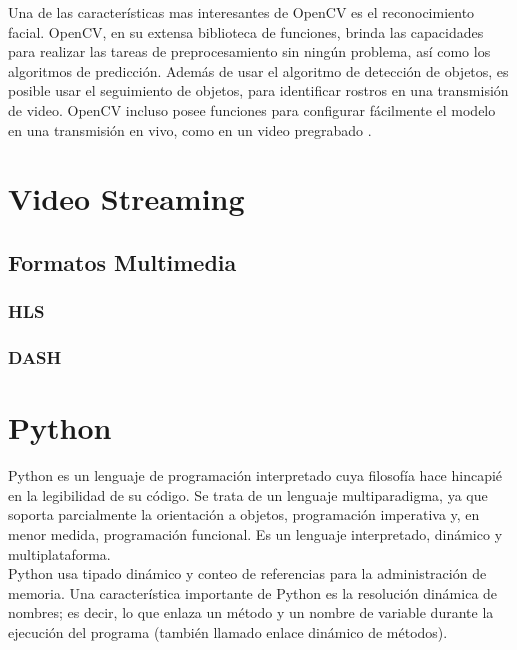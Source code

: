 Una de las características mas interesantes de OpenCV es el reconocimiento facial. OpenCV, en su extensa biblioteca de funciones, brinda las capacidades para realizar las tareas de preprocesamiento sin ningún problema, así como los algoritmos de predicción. Además de usar el algoritmo de detección de objetos, es posible usar el seguimiento de objetos, para identificar rostros en una transmisión de video. OpenCV incluso posee funciones para configurar fácilmente el modelo en una transmisión en vivo, como en un video pregrabado \cite{medium:opencv}. 

\section{Video Streaming}

\subsection{Formatos Multimedia}

\subsubsection{HLS}

\subsubsection{DASH}

\section{Python}
Python es un lenguaje de programación interpretado cuya filosofía hace hincapié en la legibilidad de su código. Se trata de un lenguaje multiparadigma, ya que soporta parcialmente la orientación a objetos, programación imperativa y, en menor medida, programación funcional. Es un lenguaje interpretado, dinámico y multiplataforma.\\

Python usa tipado dinámico y conteo de referencias para la administración de memoria. Una característica importante de Python es la resolución dinámica de nombres; es decir, lo que enlaza un método y un nombre de variable durante la ejecución del programa (también llamado enlace dinámico de métodos).\\

